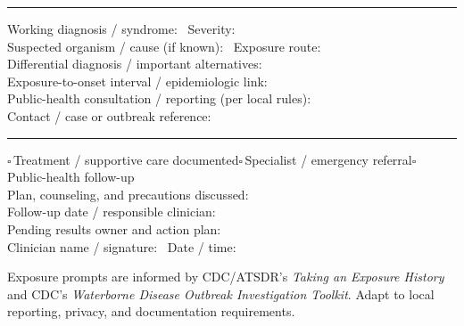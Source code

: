 \documentclass[10pt,a4paper]{article}
\newcommand{\boxx}{\ensuremath{\square}}
\newcommand{\checkitem}[1]{\boxx\,#1\quad}
\newcommand{\linefield}[2]{#1\ \underline{\hspace{#2}}}
\newcommand{\sectionbar}[1]{\vspace{3pt}{\large\bfseries #1}\par\vspace{1pt}\hrule\vspace{3pt}}
\begin{document}
\sectionbar{7. Clinical assessment}
\linefield{Working diagnosis / syndrome:}{7.0cm} \linefield{Severity:}{2.8cm}\\
\linefield{Suspected organism / cause (if known):}{6.8cm} \linefield{Exposure route:}{3.0cm}\\
\linefield{Differential diagnosis / important alternatives:}{5.1cm}\\
\linefield{Exposure-to-onset interval / epidemiologic link:}{5.5cm}\\
\linefield{Public-health consultation / reporting (per local rules):}{4.8cm}\\
\linefield{Contact / case or outbreak reference:}{6.5cm}

\sectionbar{8. Plan and follow-up}
\checkitem{Treatment / supportive care documented}\checkitem{Specialist / emergency referral}\checkitem{Public-health follow-up}\\
\linefield{Plan, counseling, and precautions discussed:}{6.5cm}\\
\linefield{Follow-up date / responsible clinician:}{6.6cm}\\
\linefield{Pending results owner and action plan:}{6.7cm}\\
\linefield{Clinician name / signature:}{6.0cm} \linefield{Date / time:}{3.5cm}

\vfill
\footnotesize Exposure prompts are informed by CDC/ATSDR's \textit{Taking an Exposure History} and CDC's \textit{Waterborne Disease Outbreak Investigation Toolkit}. Adapt to local reporting, privacy, and documentation requirements.
\end{document}
